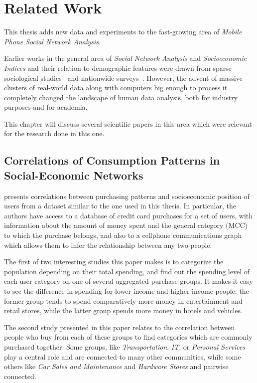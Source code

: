 
\chapter{Related Work}
\label{chap:related_work}


This thesis adds new data and experiments to the fast-growing area of \emph{Mobile Phone Social Network Analysis}.

Earlier works in the general area of \emph{Social Network Analysis} and \emph{Socioeconomic Indices} and their relation to demographic features were drawn from sparse sociological studies~\cite{katz_economics_2001} and nationwide surveys~\cite{deaton1997}. However, the advent of massive clusters of real-world data along with computers big enough to process it completely changed the landscape of human data analysis, both for industry purposes and for academia.

This chapter will discuss several scientific papers in this area which were relevant for the research done in this one.

\section{Correlations of Consumption Patterns in Social-Economic Networks}

\cite{leo16correlations} presents correlations between purchasing patterns and socioeconomic position of users from a dataset similar to the one used in this thesis. In particular, the authors have access to a database of credit card purchases for a set of users, with information about the amount of money spent and the general category (MCC) to which the purchase belongs, and also to a cellphone communications graph which allows them to infer the relationship between any two people.

The first of two interesting studies this paper makes is to categorize the population depending on their total spending, and find out the spending level of each user category on one of several aggregated purchase groups. It makes it easy to see the difference in spending for lower income and higher income people: the former group tends to spend comparatively more money in entertainment and retail stores, while the latter group spends more money in hotels and vehicles.

The second study presented in this paper relates to the correlation between people who buy from each of these groups to find categories which are commonly purchased together. Some groups, like \emph{Transportation}, \emph{IT}, or \emph{Personal Services} play a central role and are connected to many other communities, while some others like \emph{Car Sales and Maintenance} and \emph{Hardware Stores} and pairwise connected.

